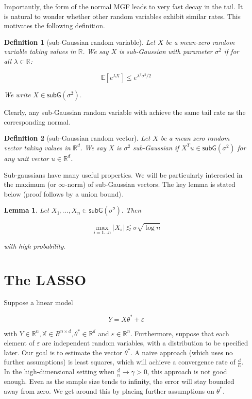 \documentclass{article}
\newcommand{\R}{\mathbb{R}}
\newcommand{\X}{\mathbb{X}}
\newcommand{\ev}[1]{\mathbb{E}\left[#1\right]}
\newcommand{\subG}{\mathsf{subG}}
\newcommand{\eps}{\varepsilon} %
\newtheorem{lemma}{Lemma}
\newtheorem{definition}{Definition}
\begin{document}
Importantly, the form of the normal MGF leads to
very fast decay in the tail. It is natural to wonder whether other random
variables exhibit similar rates. This motivates the
following definition.

\begin{definition} [sub-Gaussian random variable]
	Let $X$ be a mean-zero random variable taking values in $\R$. We say $X$ is sub-Gaussian with
	parameter $\sigma^2$ if for all $\lambda \in \R$:

	$$\ev{e^{\lambda X}} \leq e^{\lambda^2\sigma^2 / 2}$$

	We write $X \in \subG(\sigma^2)$.
\end{definition} 

Clearly, any sub-Gaussian random variable with achieve the same tail rate as the
corresponding normal.

\begin{definition}[sub-Gaussian random vector]
	Let $X$ be a mean zero random vector taking values in $\R^d$. We say $X$
	is $\sigma^2$ sub-Gaussian  if $X^Tu \in \subG(\sigma^2)$ for any unit
	vector $u \in \R^d$.
\end{definition}

Sub-gaussians have many useful properties. We will be particularly interested in the maximum (or $\infty$-norm) of
sub-Gaussian vectors. The key lemma is stated below (proof follows by a union bound).

\begin{lemma}
	Let $X_1, ..., X_n \in \subG(\sigma^2)$. Then

	$$\max_{i = 1...n}|X_i| \lesssim \sigma\sqrt{\log n}$$

	with high probability.
\end{lemma}

\section{The LASSO}


Suppose a linear model

$$Y = X\theta^{*} + \eps$$

with $Y \in \R^n, \X \in R^{n \times d}, \theta^{*} \in \R^{d}$ and $\eps \in \R^{n}$. Furthermore, suppose that each element of $\eps$ are independent random variables, with a distribution to be specified later. Our goal is to estimate the vector $\theta^{*}$. A naive approach (which uses no further assumptions) is least squares, which will achieve a convergence rate of $\frac{d}{n}$. In the high-dimensional setting when $\frac{d}{n} \rightarrow \gamma > 0$, this approach is not good enough. Even as the sample size tends to infinity, the error will stay bounded away from zero. We get around this by placing further assumptions on $\theta^{*}$.
\end{document}
